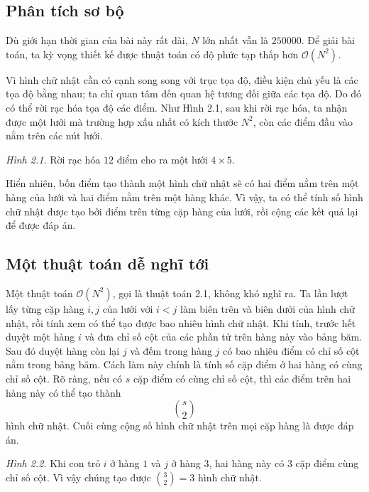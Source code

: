\documentclass[11pt]{article}
\newcommand{\Oh}{\mathcal{O}}
\begin{document}
\subsection{Phân tích sơ bộ}

Dù giới hạn thời gian của bài này rất dài, $N$ lớn nhất vẫn là $250000$. Để
giải bài toán, ta kỳ vọng thiết kế được thuật toán có độ phức tạp thấp hơn
$\Oh(N^2)$.

Vì hình chữ nhật cần có cạnh song song với trục tọa độ, điều kiện chủ yếu là
các tọa độ bằng nhau; ta chỉ quan tâm đến quan hệ tương đối giữa các tọa độ.
Do đó có thể rời rạc hóa tọa độ các điểm. Như Hình 2.1, sau khi rời rạc hóa,
ta nhận được một lưới mà trường hợp xấu nhất có kích thước $N^2$, còn các
điểm đầu vào nằm trên các nút lưới.

\begin{center}
\small
\textit{Hình 2.1.} Rời rạc hóa $12$ điểm cho ra một lưới $4\times 5$.
\end{center}

Hiển nhiên, bốn điểm tạo thành một hình chữ nhật sẽ có hai điểm nằm trên một
hàng của lưới và hai điểm nằm trên một hàng khác. Vì vậy, ta có thể tính số
hình chữ nhật được tạo bởi điểm trên từng cặp hàng của lưới, rồi cộng các kết
quả lại để được đáp án.

\subsection{Một thuật toán dễ nghĩ tới}

Một thuật toán $\Oh(N^2)$, gọi là thuật toán 2.1, không khó nghĩ ra. Ta lần
lượt lấy từng cặp hàng $i,j$ của lưới với $i<j$ làm biên trên và biên dưới
của hình chữ nhật, rồi tính xem có thể tạo được bao nhiêu hình chữ nhật. Khi
tính, trước hết duyệt một hàng $i$ và đưa chỉ số cột của các phần tử trên
hàng này vào bảng băm. Sau đó duyệt hàng còn lại $j$ và đếm trong hàng $j$ có
bao nhiêu điểm có chỉ số cột nằm trong bảng băm. Cách làm này chính là tính
số cặp điểm ở hai hàng có cùng chỉ số cột. Rõ ràng, nếu có $s$ cặp điểm có
cùng chỉ số cột, thì các điểm trên hai hàng này có thể tạo thành
\[
  \binom{s}{2}
\]
hình chữ nhật. Cuối cùng cộng số hình chữ nhật trên mọi cặp hàng là được đáp
án.

\begin{center}
\small
\textit{Hình 2.2.} Khi con trỏ $i$ ở hàng $1$ và $j$ ở hàng $3$, hai hàng này
có $3$ cặp điểm cùng chỉ số cột. Vì vậy chúng tạo được
$\binom{3}{2}=3$ hình chữ nhật.
\end{center}
\end{document}
